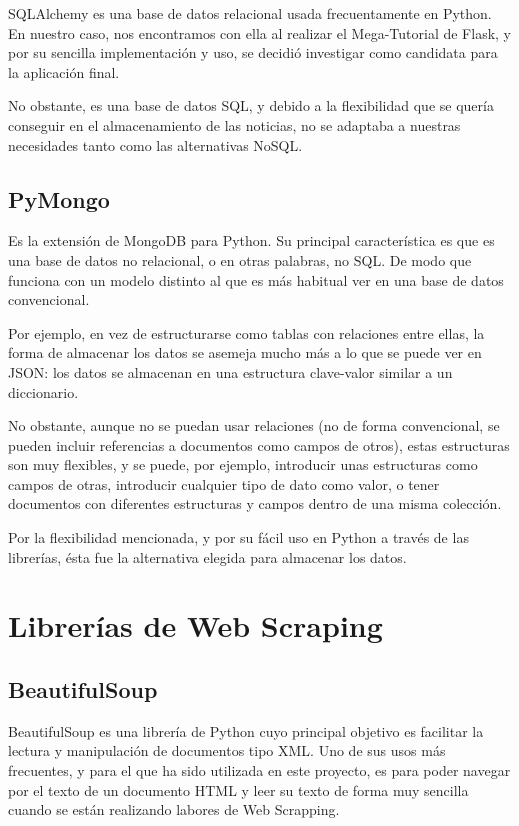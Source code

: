 SQLAlchemy \cite{copeland2008essential} es una base de datos relacional usada frecuentamente en Python. En nuestro caso, nos encontramos con ella al realizar el Mega-Tutorial de Flask, y por su sencilla implementación y uso, se decidió investigar como candidata para la aplicación final.

No obstante, es una base de datos SQL, y debido a la flexibilidad que se quería conseguir en el almacenamiento de las noticias, no se adaptaba a nuestras necesidades tanto como las alternativas NoSQL.

\subsection{PyMongo}

Es la extensión de MongoDB \cite{Chodorow:2010:MDG:1941134} para Python. Su principal característica es que es una base de datos no relacional, o en otras palabras, no SQL. De modo que funciona con un modelo distinto al que es más habitual ver en una base de datos convencional. 

Por ejemplo, en vez de estructurarse como tablas con relaciones entre ellas, la forma de almacenar los datos se asemeja mucho más a lo que se puede ver en JSON: los datos se almacenan en una estructura clave-valor similar a un diccionario. 

No obstante, aunque no se puedan usar relaciones (no de forma convencional, se pueden incluir referencias a documentos como campos de otros), estas estructuras son muy flexibles, y se puede, por ejemplo, introducir unas estructuras como campos de otras, introducir cualquier tipo de dato como valor, o tener documentos con diferentes estructuras y campos dentro de una misma colección.

Por la flexibilidad mencionada, y por su fácil uso en Python a través de las librerías, ésta fue la alternativa elegida para almacenar los datos.

\section{Librerías de Web Scraping}

\subsection{BeautifulSoup}

BeautifulSoup \cite{richardson2007beautiful} \cite{beautifulsoup} es una librería de Python cuyo principal objetivo es facilitar la lectura y manipulación de documentos tipo XML. Uno de sus usos más frecuentes, y para el que ha sido utilizada en este proyecto, es para poder navegar por el texto de un documento HTML y leer su texto de forma muy sencilla cuando se están realizando labores de Web Scrapping. 

